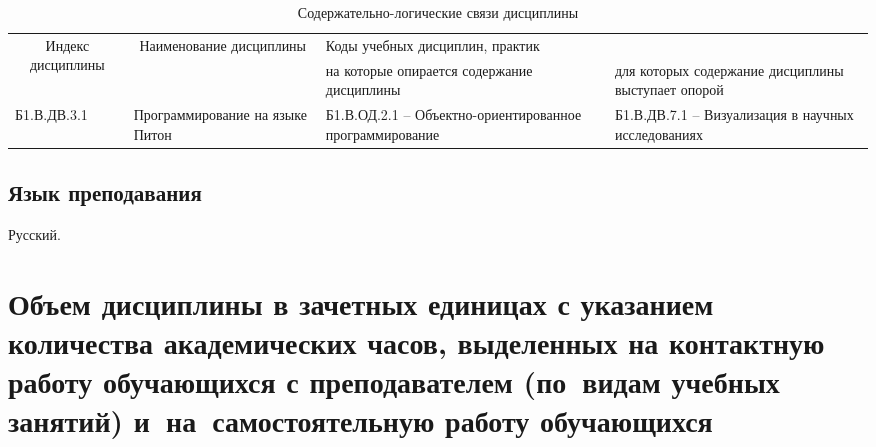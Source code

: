 \documentclass[a4paper,12pt]{article}
\begin{document}
  \begin{table}[H]
  \setlength\arraycolsep{3pt}
  \caption{Содержательно-логические связи дисциплины}
  \begin{tabular}{|l|p{18ex}|*{2}{p{23ex}|}}
  \hline
  \multicolumn{1}{|c|}{\multirow{2}{13ex}{\centering Индекс \linebreak дисциплины}} &
  \multicolumn{1}{c|}{\multirow{2}{18ex}{\centering Наименование \linebreak дисциплины}} & 
  \multicolumn{2}{p{46ex}|}{\centering Коды учебных дисциплин, практик} \\
  \cline{3-4}
   & & 
  \centering на которые опирается содержание дисциплины & 
  \centering\arraybackslash для которых содержание дисциплины выступает опорой
  \\ \hline
  Б1.В.ДВ.3.1 & Программирование на языке Питон 
  & 
  
  Б1.В.ОД.2.1 -- Объектно-ориентированное программирование 
  & 
  
  Б1.В.ДВ.7.1 -- Визуализация в научных исследованиях 
  \\ \hline
  \end{tabular}
  \end{table}


\subsection{Язык преподавания} 
  Русский.
  



\newpage

\section{Объем дисциплины в зачетных единицах с указанием количества академических часов, выделенных на контактную работу обучающихся с преподавателем (по~видам учебных занятий) и~на~самостоятельную работу обучающихся}
\end{document}
